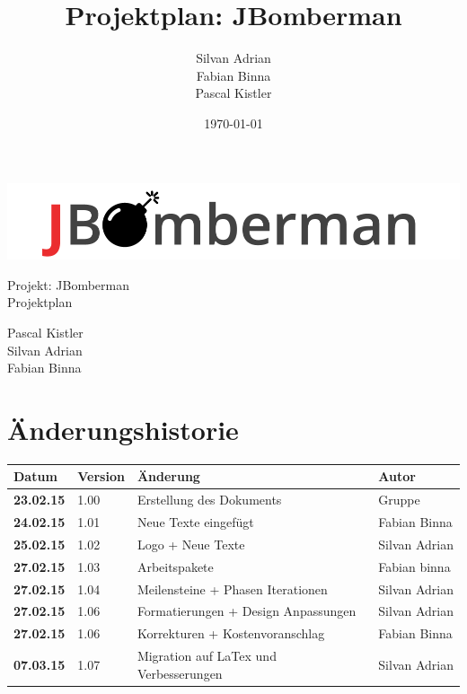 \documentclass[11pt]{scrartcl}
\title{Projektplan: JBomberman}
\author{Silvan Adrian \\ Fabian Binna \\ Pascal Kistler}
\date{\today{}}
\begin{document}
\def\arraystretch{1.5}
\begin{titlepage}
\begin{center}
\vspace{10em}
\includegraphics[scale=2]{jbomberman}
\vspace{10em}
\end{center}
\begin{center}
\huge {Projekt: JBomberman} \\
\huge {Projektplan}
\end{center}
\begin{center}
\vspace{10em}
\LARGE {Pascal Kistler} \\
\LARGE {Silvan Adrian} \\
\LARGE {Fabian Binna}
\end{center}

\end{titlepage}

\newpage
\section{Änderungshistorie}
\label{sec:Änderungen}

\begin{tabularx}{\linewidth}{l l l l}
\textbf{Datum} & \textbf{Version} & \textbf{Änderung}  & \textbf{Autor} \\
\hline
\textbf{23.02.15} & 1.00 & Erstellung des Dokuments & Gruppe \\
\textbf{24.02.15} & 1.01 & Neue Texte eingefügt & Fabian Binna \\
\textbf{25.02.15} & 1.02 & Logo + Neue Texte & Silvan Adrian \\
\textbf{27.02.15} & 1.03 & Arbeitspakete & Fabian binna \\
\textbf{27.02.15} & 1.04 & Meilensteine + Phasen Iterationen & Silvan Adrian \\
\textbf{27.02.15} & 1.06 & Formatierungen + Design Anpassungen & Silvan Adrian \\
\textbf{27.02.15} & 1.06 & Korrekturen + Kostenvoranschlag & Fabian Binna \\
\textbf{07.03.15} & 1.07 & Migration auf LaTex und Verbesserungen & Silvan Adrian
\end{tabularx}
\end{document}
